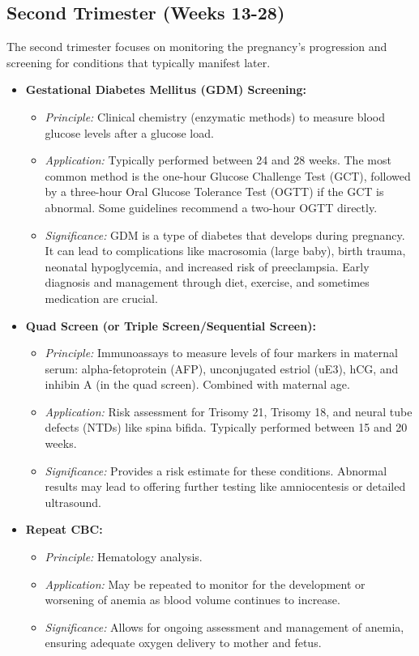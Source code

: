 \documentclass{article}
\begin{document}
\subsection{Second Trimester (Weeks 13-28)}
The second trimester focuses on monitoring the pregnancy's progression and screening for conditions that typically manifest later.

\begin{itemize}
    \item \textbf{Gestational Diabetes Mellitus (GDM) Screening:}
    \begin{itemize}
        \item \textit{Principle:} Clinical chemistry (enzymatic methods) to measure blood glucose levels after a glucose load.
        \item \textit{Application:} Typically performed between 24 and 28 weeks. The most common method is the one-hour Glucose Challenge Test (GCT), followed by a three-hour Oral Glucose Tolerance Test (OGTT) if the GCT is abnormal. Some guidelines recommend a two-hour OGTT directly.
        \item \textit{Significance:} GDM is a type of diabetes that develops during pregnancy. It can lead to complications like macrosomia (large baby), birth trauma, neonatal hypoglycemia, and increased risk of preeclampsia. Early diagnosis and management through diet, exercise, and sometimes medication are crucial.
    \end{itemize}
    \item \textbf{Quad Screen (or Triple Screen/Sequential Screen):}
    \begin{itemize}
        \item \textit{Principle:} Immunoassays to measure levels of four markers in maternal serum: alpha-fetoprotein (AFP), unconjugated estriol (uE3), hCG, and inhibin A (in the quad screen). Combined with maternal age.
        \item \textit{Application:} Risk assessment for Trisomy 21, Trisomy 18, and neural tube defects (NTDs) like spina bifida. Typically performed between 15 and 20 weeks.
        \item \textit{Significance:} Provides a risk estimate for these conditions. Abnormal results may lead to offering further testing like amniocentesis or detailed ultrasound.
    \end{itemize}
    \item \textbf{Repeat CBC:}
    \begin{itemize}
        \item \textit{Principle:} Hematology analysis.
        \item \textit{Application:} May be repeated to monitor for the development or worsening of anemia as blood volume continues to increase.
        \item \textit{Significance:} Allows for ongoing assessment and management of anemia, ensuring adequate oxygen delivery to mother and fetus.
    \end{itemize}
\end{itemize}
\end{document}
